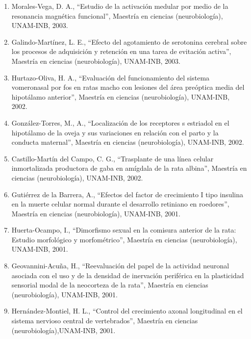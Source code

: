 \documentclass[11pt]{article}
\begin{document}
\begin{enumerate}
\item Morales-Vega, D. A., “Estudio de la activación medular por medio de la resonancia magnética funcional”, Maestría en ciencias (neurobiología), 
UNAM-INB,   
2003.

\item 
Galindo-Martínez, L. E., “Efecto del agotamiento de serotonina cerebral sobre los procesos de adquisición y retención en una tarea de evitación 
activa”, 
Maestría en ciencias (neurobiología), UNAM-INB,   2003.

\item Hurtazo-Oliva, H. A., “Evaluación del funcionamiento del sistema vomeronasal por fos en ratas macho con lesiones del área preóptica media del 
hipotálamo 
anterior”, Maestría en ciencias (neurobiología), UNAM-INB,   2002.

\item González-Torres, M., A., “Localización de los receptores s estriadol en el hipotálamo de la oveja y sus variaciones en relación con el parto y la 
conducta 
maternal”, Maestría en ciencias (neurobiología), UNAM-INB,   2002.

\item Castillo-Martín del Campo, C. G., “Trasplante de una línea celular inmortalizada productora de gaba en amígdala de la rata albina”, Maestría en 
ciencias 
(neurobiología), UNAM-INB,   2002.

\item Gutiérrez de la Barrera, A., “Efectos del factor de crecimiento I tipo insulina en la muerte celular normal durante el desarrollo retiniano en 
roedores”, 
Maestría en ciencias (neurobiología), UNAM-INB,   2001.

\item Huerta-Ocampo, I., “Dimorfismo sexual en la comisura anterior de la rata: Estudio morfológico y morfométrico”, Maestría en ciencias (neurobiología), 
UNAM-INB,   2001.

\item Geovannini-Acuña, H., “Reevaluación del papel de la actividad neuronal asociada con el uso y de la densidad de inervación periférica en la plasticidad 
sensorial modal de la neocorteza de la rata”, Maestría en ciencias (neurobiología), UNAM-INB,   2001.

\item Hernández-Montiel, H. L., “Control del crecimiento axonal longitudinal en el sistema nervioso central de vertebrados”, Maestría en ciencias 
(neurobiología),UNAM-INB,   2001.


\end{enumerate}
\end{document}
